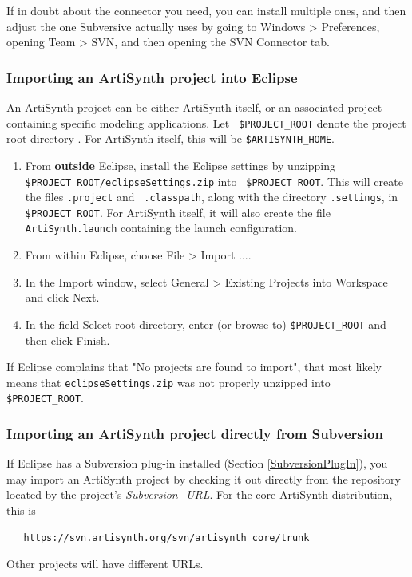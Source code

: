 \documentclass{article}
\def\SEP{/}
\def\directory{directory }
\begin{document}
If in doubt about the connector you need, you can install multiple
ones, and then adjust the one Subversive actually uses by going to
{\sf Windows > Preferences}, opening {\sf Team > SVN}, and then
opening the {\sf SVN Connector} tab.

\subsubsection{Importing an ArtiSynth project into Eclipse}
\label{importingArtisynth}

An ArtiSynth project can be either ArtiSynth itself, or an associated
project containing specific modeling applications. Let {\tt
\$PROJECT\_ROOT} denote the project root \directory. For ArtiSynth
itself, this will be {\tt \$ARTISYNTH\_HOME}.

\begin{enumerate}

\item From {\bf outside} Eclipse, install the Eclipse settings by
unzipping {\tt \$PROJECT\_ROOT\SEP eclipse\-Settings.zip} into {\tt
\$PROJECT\_ROOT}. This will create the files {\tt .project} and {\tt
.classpath}, along with the \directory {\tt .settings}, in {\tt
\$PROJECT\_ROOT}.  For ArtiSynth itself, it will also create the file
{\tt ArtiSynth.launch} containing the launch configuration.
  
\item From within Eclipse, choose {\sf File > Import ...}.

\item In the {\sf Import} window, select {\sf General > Existing Projects into
Workspace} and click {\sf Next}.

\item In the field {\sf Select root directory}, enter (or browse to) 
{\tt \$PROJECT\_ROOT} and then click {\sf Finish}. 

\end{enumerate}

If Eclipse complains that {\sf "No projects are found to import"}, that most
likely means that {\tt eclipseSettings.zip} was not
properly unzipped into {\tt \$PROJECT\_ROOT}.

\subsubsection{Importing an ArtiSynth project directly from Subversion}
\label{importingFromSubversion}

If Eclipse has a Subversion plug-in installed (Section
\ref{SubversionPlugIn}), you may import an ArtiSynth project by
checking it out directly from the repository located by
the project's {\it Subversion\_URL}. For the core ArtiSynth
distribution, this is 
\begin{verbatim}
   https://svn.artisynth.org/svn/artisynth_core/trunk
\end{verbatim}
Other projects will have different URLs.
\end{document}
